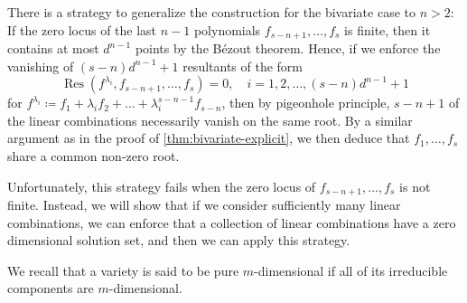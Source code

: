 \documentclass[11pt,a4paper]{article}
\numberwithin{equation}{section}
\DeclareMathOperator{\Res}{Res}
\begin{document}
There is a strategy to generalize the construction for the bivariate case to $n>2$:
If the zero locus of the last $n-1$ polynomials $f_{s-n+1},\dots,f_{s}$ is finite, then it contains at most $d^{n-1}$ points by the B\'{e}zout theorem. 
Hence, if we enforce the vanishing of $(s-n)d^{n-1}+1$ resultants of the form \[
\Res(f^{\lambda_i},f_{s-n+1},\dots,f_s) = 0, \quad i=1,2,\dots,(s-n)d^{n-1}+1
\] for $f^{\lambda_i}\coloneqq f_1 + \lambda_i f_2 + \dots + \lambda_i^{s-n-1}f_{s-n}$, then by pigeonhole principle, $s-n+1$ of the linear combinations necessarily vanish on the same root.
By a similar argument as in the proof of \cref{thm:bivariate-explicit}, we then deduce that $f_1,\dots,f_s$ share a common non-zero root. 

Unfortunately, this strategy fails when the zero locus of $f_{s-n+1},\dots,f_s$ is not finite.
Instead, we will show that if we consider sufficiently many linear combinations, we can enforce that a collection of linear combinations have a zero dimensional solution set, and then we can apply this strategy.

We recall that a variety is said to be pure $m$-dimensional if all of its irreducible components are $m$-dimensional.
\end{document}
